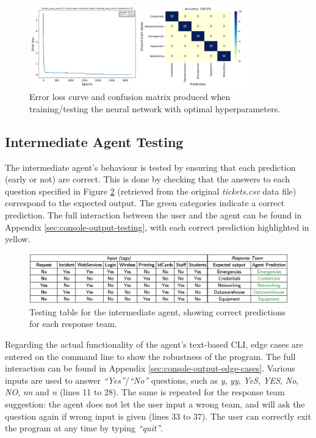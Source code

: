 \documentclass[letterpaper,12pt]{article}
\begin{document}
\begin{figure}[h] 
\centerline{\includegraphics[width=0.85\textwidth]{report/figures/basic_testing.png}}
\caption{\label{fig:basic_testing}Error loss curve and confusion matrix produced when training/testing the neural network with optimal hyperparameters.}
\end{figure}

\subsection{Intermediate Agent Testing}

The intermediate agent's behaviour is tested by ensuring that each prediction (early or not) are correct. This is done by checking that the answers to each question specified in Figure \ref{fig:intermediate_testing} (retrieved from the original \textit{tickets.csv} data file) correspond to the expected output. The green categories indicate a correct prediction. The full interaction between the user and the agent can be found in Appendix \ref{sec:console-output-testing}, with each correct prediction highlighted in yellow.

\begin{figure}[h] 
\centerline{\includegraphics[width=\textwidth]{report/figures/intermediate_testing.png}}
\caption{\label{fig:intermediate_testing}Testing table for the intermediate agent, showing correct predictions for each response team.}
\end{figure}

Regarding the actual functionality of the agent's text-based CLI, edge cases are entered on the command line to show the robustness of the program. The full interaction can be found in Appendix \ref{sec:console-output-edge-cases}. Various inputs are used to answer \textit{``Yes''}/\textit{``No''} questions, such as \textit{y}, \textit{yy}, \textit{YeS}, \textit{YES}, \textit{No}, \textit{NO}, \textit{nn} and \textit{n} (lines 11 to 28). The same is repeated for the response team suggestion: the agent does not let the user input a wrong team, and will ask the question again if wrong input is given (lines 33 to 37). The user can correctly exit the program at any time by typing \textit{``quit''}.
\end{document}
